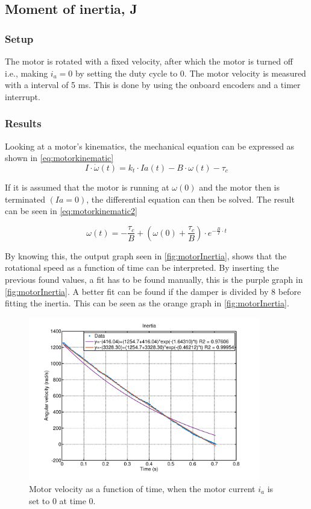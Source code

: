 \subsection{Moment of inertia, J}
\subsubsection{Setup}
The motor is rotated with a fixed velocity, after which the motor is turned off i.e., making $i_a = 0$ by setting the duty cycle to 0. The motor velocity is measured with a interval of 5 ms. This is done by using the onboard encoders and a timer interrupt.

\subsubsection{Results}
Looking at a motor's kinematics, the mechanical equation can be expressed as shown in \autoref{eq:motorkinematic} 
\begin{equation}\label{eq:motorkinematic}
I \cdot \dot \omega(t) = k_t \cdot Ia(t)- B \cdot \omega(t)- \tau_c
\end{equation}

If it is assumed that the motor is running at $\omega(0)$ and the motor then is terminated $(Ia = 0)$, the differential equation can then be solved. The result can be seen in \autoref{eq:motorkinematic2}

\begin{equation}\label{eq:motorkinematic2}
\omega(t) = -\frac{\tau_c}{B} + \left(\omega(0)+\frac{\tau_c}{B}\right) \cdot e^{-\frac{B}{I} \cdot t}
\end{equation}

By knowing this, the output graph seen in \autoref{fig:motorInertia}, shows that the rotational speed as a function of time can be interpreted. By inserting the previous found values, a fit has to be found manually, this is the purple graph in \autoref{fig:motorInertia}. A better fit can be found if the damper is divided by 8 before fitting the inertia. This can be seen as the orange graph in \autoref{fig:motorInertia}.

\begin{figure}[H]
	\centering
	\includegraphics[width=0.90\textwidth]{figures/motorMeasurements/inertia.pdf}
	\caption{Motor velocity as a function of time, when the motor current $i_a$ is set to 0 at time 0.}
	\label{fig:motorInertia}
\end{figure}

